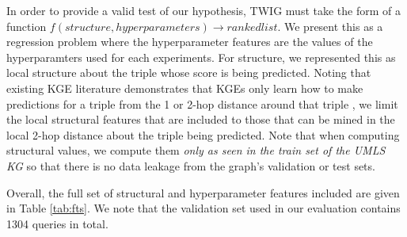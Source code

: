 In order to provide a valid test of our hypothesis, TWIG must take the form of a function $f(structure, hyperparameters) \rightarrow ranked list$. We present this as a regression problem where the hyperparameter features are the values of the hyperparamters used for each experiments. For structure, we represented this as local structure about the triple whose score is being predicted. Noting that existing KGE literature demonstrates that KGEs only learn how to make predictions for a triple from the 1 or 2-hop distance around that triple \cite{topological-imbalance,PoLo,kge-poisoning,kge-poisoning-2,gradient-rollback}, we limit the local structural features that are included to those that can be mined in the local 2-hop distance about the triple being predicted. Note that when computing structural values, we compute them \textit{only as seen in the train set of the UMLS KG} so that there is no data leakage from the graph's validation or test sets.

Overall, the full set of structural and hyperparameter features included are given in Table \ref{tab:fts}. We note that the validation set used in our evaluation contains 1304 queries in total.

